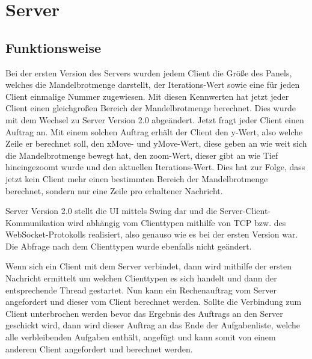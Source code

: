 \documentclass[12pt, onecolumn, notitlepage]{scrartcl}
\begin{document}
\section{Server}
\subsection{Funktionsweise}
Bei der ersten Version des Servers wurden jedem Client die Größe des Panels, welches die Mandelbrotmenge darstellt, der Iterations-Wert sowie eine für jeden Client einmalige Nummer zugewiesen. Mit diesen Kennwerten hat jetzt jeder Client einen gleichgroßen Bereich der Mandelbrotmenge berechnet. Dies wurde mit dem Wechsel zu Server Version 2.0 abgeändert. Jetzt fragt jeder Client einen Auftrag an. Mit einem solchen Auftrag erhält der Client den y-Wert, also welche Zeile er berechnet soll, den xMove- und yMove-Wert, diese geben an wie weit sich die Mandelbrotmenge bewegt hat, den zoom-Wert, dieser gibt an wie Tief hineingezoomt wurde und den aktuellen Iterations-Wert. Dies hat zur Folge, dass jetzt kein Client mehr einen bestimmten Bereich der Mandelbrotmenge berechnet, sondern nur eine Zeile pro erhaltener Nachricht. \par
Server Version 2.0 stellt die UI mittels Swing dar und die Server-Client-Kommunikation wird abhängig vom Clienttypen mithilfe von TCP bzw. des WebSocket-Protokolls realisiert, also genauso wie es bei der ersten Version war. Die Abfrage nach dem Clienttypen wurde ebenfalls nicht geändert. \par
Wenn sich ein Client mit dem Server verbindet, dann wird mithilfe der ersten Nachricht ermittelt um welchen Clienttypen es sich handelt und dann der entsprechende Thread gestartet. Nun kann ein Rechenauftrag vom Server angefordert und dieser vom Client berechnet werden. Sollte die Verbindung zum Client unterbrochen werden bevor das Ergebnis des Auftrags an den Server geschickt wird, dann wird dieser Auftrag an das Ende der Aufgabenliste, welche alle verbleibenden Aufgaben enthält, angefügt und kann somit von einem anderem Client angefordert und berechnet werden.
\end{document}
